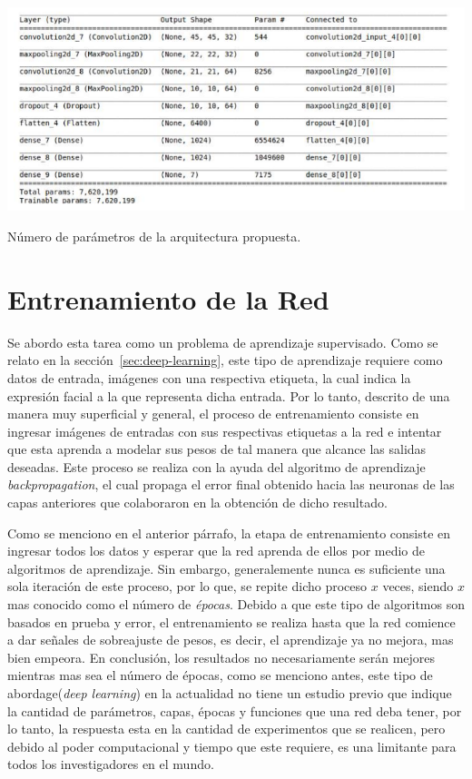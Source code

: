 \begin{table}[H]
    \centering
    \includegraphics[width=160mm]{Imagenes/parametros.png} 
    \caption{Número de parámetros de la arquitectura propuesta.}
    \label{tab:parametros}
\end{table}

	
\section{Entrenamiento de la Red}

Se abordo esta tarea como un problema de aprendizaje supervisado. Como se relato en la sección~\ref{sec:deep-learning}, este tipo de aprendizaje requiere como datos de entrada, imágenes con una respectiva etiqueta, la cual indica la expresión facial a la que representa dicha entrada. Por lo tanto, descrito de una manera muy superficial y general, el proceso de entrenamiento consiste en ingresar imágenes de entradas con sus respectivas etiquetas a la red e intentar que esta aprenda a modelar sus pesos de tal manera que alcance las salidas deseadas. Este proceso se realiza con la ayuda del algoritmo de aprendizaje \textit{backpropagation}, el cual propaga el error final obtenido hacia las neuronas de las capas anteriores que colaboraron en la obtención de dicho resultado.

Como se menciono en el anterior párrafo, la etapa de entrenamiento consiste en ingresar todos los datos y esperar que la red aprenda de ellos por medio de algoritmos de aprendizaje. Sin embargo, generalemente nunca es suficiente una sola iteración de este proceso, por lo que, se repite dicho proceso $x$ veces, siendo $x$ mas conocido como el número de \textit{épocas}. Debido a que este tipo de algoritmos son basados en prueba y error, el entrenamiento se realiza hasta que la red comience a dar señales de sobreajuste de pesos, es decir, el aprendizaje ya no mejora, mas bien empeora. En conclusión, los resultados no necesariamente serán mejores mientras mas sea el número de épocas, como se menciono antes, este tipo de abordage(\textit{deep learning}) en la actualidad no tiene un estudio previo que indique la cantidad de parámetros, capas, épocas y funciones que una red deba tener, por lo tanto, la respuesta esta en la cantidad de experimentos que se realicen, pero debido al poder computacional y tiempo que este requiere, es una limitante para todos los investigadores en el mundo. 


